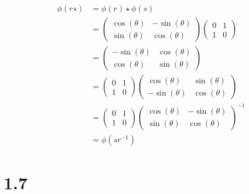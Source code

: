 \begin{enumerate}
	      \begin{align*}
		      \phi(rs) & = \phi(r) \star \phi(s)                      \\
		               & = \begin{pmatrix}
			                   \cos (\theta) & -\sin(\theta) \\
			                   \sin (\theta) & \cos(\theta)
		                   \end{pmatrix}\begin{pmatrix}
			                                0 & 1 \\
			                                1 & 0
		                                \end{pmatrix}              \\
		               & = \begin{pmatrix}
			                   -\sin(\theta) & \cos (\theta) \\
			                   \cos(\theta)  & \sin (\theta)
		                   \end{pmatrix}              \\
		               & = \begin{pmatrix}
			                   0 & 1 \\
			                   1 & 0
		                   \end{pmatrix}\begin{pmatrix}
			                                \cos (\theta)  & \sin(\theta) \\
			                                -\sin (\theta) & \cos(\theta)
		                                \end{pmatrix} \\
		               & = \begin{pmatrix}
			                   0 & 1 \\
			                   1 & 0
		                   \end{pmatrix}\begin{pmatrix}
			                                \cos (\theta) & -\sin(\theta) \\
			                                \sin (\theta) & \cos(\theta)
		                                \end{pmatrix}^{-1} \\
		               & = \phi(sr^{-1})
	      \end{align*}
\end{enumerate}

\section*{1.7}

